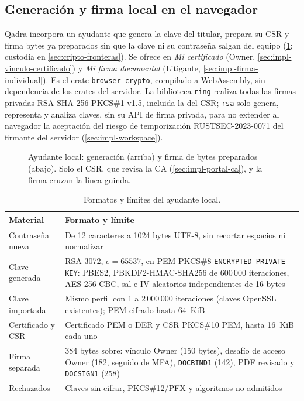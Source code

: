 \subsection{Generación y firma local en el navegador}
\label{sec:impl-criptografia-local}

Qadra incorpora un ayudante que genera la clave del titular, prepara su CSR y
firma bytes ya preparados sin que la clave ni su contraseña salgan del equipo
(\cref{fig:impl-nav-worker}; custodia en \cref{sec:cripto-fronteras}). Se
ofrece en \emph{Mi certificado} (Owner,
\cref{sec:impl-vinculo-certificado}) y \emph{Mi firma documental} (Litigante,
\cref{sec:impl-firma-individual}). Es el crate \texttt{browser-crypto},
compilado a WebAssembly, sin dependencia de los crates del servidor.
La biblioteca \texttt{ring} realiza todas las firmas privadas RSA SHA-256 PKCS\#1 v1.5,
incluida la del CSR; \texttt{rsa} solo genera, representa y analiza claves, sin
su API de firma privada, para no extender al navegador la aceptación del
riesgo de temporización RUSTSEC-2023-0071 \cite{rustsec2023_0071} del
firmante del servidor (\cref{sec:impl-workspace}).

\begin{figure}[!tb]
  \centering
  
  \caption{Ayudante local: generación (arriba) y firma de bytes preparados
    (abajo). Solo el CSR, que revisa la CA (\cref{sec:impl-portal-ca}), y la
    firma cruzan la línea guinda.}
  \label{fig:impl-nav-worker}
\end{figure}

\begin{table}[!b]
  \centering
  \caption{Formatos y límites del ayudante local.}
  \label{tab:impl-nav-formatos}
  
  \begin{tabularx}{\linewidth}{@{}L{2.6cm} X@{}}
    \toprule
    \textbf{Material} & \textbf{Formato y límite} \\
    \midrule
    Contraseña nueva & De 12 caracteres a 1024 bytes UTF-8, sin recortar espacios ni normalizar \\
    Clave generada & RSA-3072, $e=65537$, en PEM PKCS\#8 \texttt{ENCRYPTED PRIVATE KEY}: PBES2, PBKDF2-HMAC-SHA256 de 600\,000 iteraciones, AES-256-CBC, sal e IV aleatorios independientes de 16 bytes \\
    Clave importada & Mismo perfil con 1 a 2\,000\,000 iteraciones (claves OpenSSL existentes); PEM cifrado hasta 64~KiB \\
    Certificado y CSR & Certificado PEM o DER y CSR PKCS\#10 PEM, hasta 16~KiB cada uno \\
    Firma separada & 384 bytes sobre: vínculo Owner (150 bytes), desafío de acceso Owner (182, seguido de MFA), \texttt{DOCBIND1} (142), PDF revisado y \texttt{DOCSIGN1} (258) \\
    Rechazados & Claves sin cifrar, PKCS\#12/PFX y algoritmos no admitidos \\
    \bottomrule
  \end{tabularx}
\end{table}

